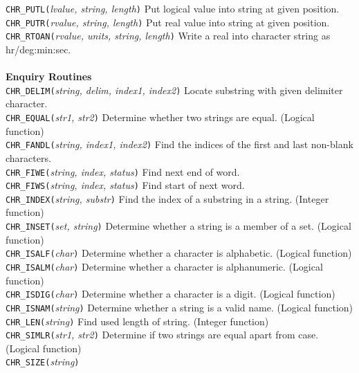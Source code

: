 \documentclass[twoside,11pt,nolof]{starlink}
\begin{document}
\begin{tabbing}
 {{\tt{CHR\_PUTL(}}\emph{lvalue, string, length}\texttt{)}}\>
 Put logical value into string at given position.\\
 {{\tt{CHR\_PUTR(}}\emph{rvalue, string, length}\texttt{)}}\>
 Put real value into string at given position.\\
 {{\tt{CHR\_RTOAN(}}\emph{rvalue, units, string, length}\texttt{)}}\>
 Write a real into character string as hr/deg:min:sec.\\
\\
\textbf{Enquiry Routines}\\
 {{\tt{CHR\_DELIM(}}\emph{string, delim, index1, index2}\texttt{)}} \>
 Locate substring with given delimiter character.\\
 {{\tt{CHR\_EQUAL(}}\emph{str1, str2}\texttt{)}}\>
 Determine whether two strings are equal. (Logical function)\\
 {{\tt{CHR\_FANDL(}}\emph{string, index1, index2}\texttt{)}}\>
 Find the indices of the first and last non-blank characters.\\
 {{\tt{CHR\_FIWE(}}\emph{string, index, status}\texttt{)}}\>
 Find next end of word.\\
 {{\tt{CHR\_FIWS(}}\emph{string, index, status}\texttt{)}}\>
 Find start of next word.\\
 {{\tt{CHR\_INDEX(}}\emph{string, substr}\texttt{)}}\>
 Find the index of a substring in a string. (Integer function)\\
 {{\tt{CHR\_INSET(}}\emph{set, string}\texttt{)}}\>
 Determine whether a string is a member of a set. (Logical function)\\
 {{\tt{CHR\_ISALF(}}\emph{char}\texttt{)}}\>
 Determine whether a character is alphabetic. (Logical function)\\
 {{\tt{CHR\_ISALM(}}\emph{char}\texttt{)}}\>
 Determine whether a character is alphanumeric. (Logical function)\\
 {{\tt{CHR\_ISDIG(}}\emph{char}\texttt{)}}\>
 Determine whether a character is a digit. (Logical function)\\
 {{\tt{CHR\_ISNAM(}}\emph{string}\texttt{)}}\>
 Determine whether a string is a valid name. (Logical function)\\
 {{\tt{CHR\_LEN(}}\emph{string}\texttt{)}}\>
 Find used length of string. (Integer function)\\
 {{\tt{CHR\_SIMLR(}}\emph{str1, str2}\texttt{)}}\>
 Determine if two strings are equal apart from case. (Logical function)\\
 {{\tt{CHR\_SIZE(}}\emph{string}\texttt{)}}\>

\end{tabbing}
\end{document}
